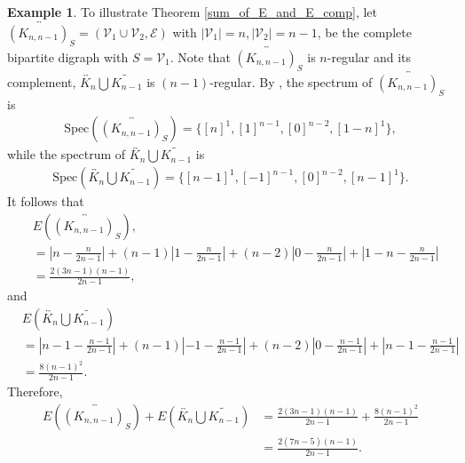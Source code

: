 \documentclass[12pt,a4paper,reqno]{amsart}
\numberwithin{equation}{section}
\theoremstyle{plain}
\theoremstyle{definition}
\newtheorem{example}[theorem]{Example}
\newcommand{\<}{\langle}
\renewcommand{\>}{\rangle}
\newcommand{\cE}{{\mathcal E}}
\newcommand{\cV}{{\mathcal V}}
\begin{document}
    \begin{example}
        To illustrate Theorem \ref{sum_of_E_and_E_comp}, let $\overleftrightarrow{(K_{n,n-1})_S}=(\cV_1 \cup \cV_2, \cE)$ with $ |\cV_1|=n, |\cV_2|=n-1$, be the complete bipartite digraph with $S=\cV_1$. Note that $\overleftrightarrow{(K_{n,n-1})_S}$ is $n$-regular and its complement, $\overleftrightarrow{K_n} \bigcup \widetilde{K_{n-1}}$ is $(n-1)$-regular. By \cite{akbari2023selfloop}, the spectrum of $\overleftrightarrow{(K_{n,n-1})_S}$ is 
        \begin{align*}
            \mathrm{Spec} \left( \overleftrightarrow{(K_{n,n-1})_S} \right) = \{[n]^1, [1]^{n-1}, [0]^{n-2}, [1-n]^1 \},
        \end{align*}
        while the spectrum of $\overleftrightarrow{K_n} \bigcup \widetilde{K_{n-1}}$ is 
        \begin{align*}
            \mathrm{Spec} \left(\overleftrightarrow{K_n} \bigcup \widetilde{K_{n-1}} \right) =\{ [n-1]^1, [-1]^{n-1}, [0]^{n-2}, [n-1]^1\}. 
        \end{align*}
        It follows that
        \begin{align*}
            &E\left( \overleftrightarrow{(K_{n,n-1})_S} \right), \\
            &= \left|n-\frac{n}{2n-1} \right| +  (n-1) \left|1-\frac{n}{2n-1}\right| + (n-2)\left|0-\frac{n}{2n-1}\right|+ \left|1-n-\frac{n}{2n-1}\right| \\
            &=\frac{2(3n-1)(n-1)}{2n-1},
        \end{align*}
        and 
        \begin{align*}
              &E \left(\overleftrightarrow{K_n} \bigcup \widetilde{K_{n-1}} \right) \\
              &= \left|n-1-\frac{n-1}{2n-1} \right| +  (n-1) \left|-1-\frac{n-1}{2n-1}\right| + (n-2)\left|0-\frac{n-1}{2n-1}\right|+ \left|n-1-\frac{n-1}{2n-1}\right| \\
              &= \frac{8(n-1)^2}{2n-1}.
        \end{align*}
        Therefore,
        \begin{align*}
            E\left( \overleftrightarrow{(K_{n,n-1})_S} \right)+  E \left(\overleftrightarrow{K_n} \bigcup \widetilde{K_{n-1}} \right) &=\frac{2(3n-1)(n-1)}{2n-1}+ \frac{8(n-1)^2}{2n-1}\\
            &=\frac{2(7n-5)(n-1)}{2n-1}.
        \end{align*}


\end{example}
\end{document}
